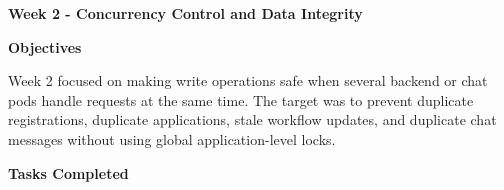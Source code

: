 \vspace{0.5em}\noindent\textbf{Week 2 - Concurrency Control and Data
Integrity}\par

\vspace{0.5em}\noindent\textbf{Objectives}\par

Week 2 focused on making write operations safe when several backend or
chat pods handle requests at the same time. The target was to prevent
duplicate registrations, duplicate applications, stale workflow updates,
and duplicate chat messages without using global application-level
locks.

\vspace{0.5em}\noindent\textbf{Tasks Completed}\par

